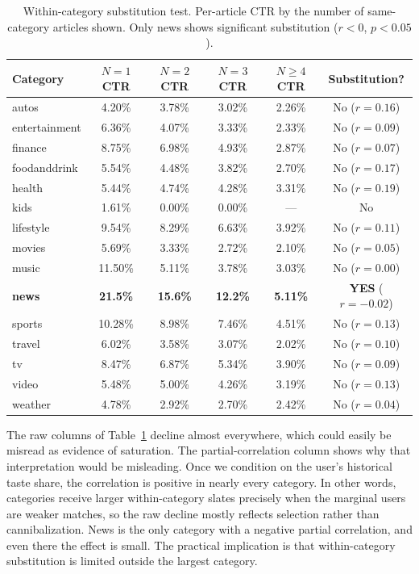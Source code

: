\documentclass[11pt]{article}
\begin{document}
\begin{table}[ht]
\centering
\caption{Within-category substitution test. Per-article CTR by the number of same-category articles shown. Only news shows significant substitution ($r < 0$, $p < 0.05$).}
\label{tab:substitution}
\small
\begin{tabular}{lccccc}
\toprule
Category & $N{=}1$ CTR & $N{=}2$ CTR & $N{=}3$ CTR & $N{\geq}4$ CTR & Substitution? \\
\midrule
autos & 4.20\% & 3.78\% & 3.02\% & 2.26\% & No ($r{=}0.16$) \\
entertainment & 6.36\% & 4.07\% & 3.33\% & 2.33\% & No ($r{=}0.09$) \\
finance & 8.75\% & 6.98\% & 4.93\% & 2.87\% & No ($r{=}0.07$) \\
foodanddrink & 5.54\% & 4.48\% & 3.82\% & 2.70\% & No ($r{=}0.17$) \\
health & 5.44\% & 4.74\% & 4.28\% & 3.31\% & No ($r{=}0.19$) \\
kids & 1.61\% & 0.00\% & 0.00\% & --- & No \\
lifestyle & 9.54\% & 8.29\% & 6.63\% & 3.92\% & No ($r{=}0.11$) \\
movies & 5.69\% & 3.33\% & 2.72\% & 2.10\% & No ($r{=}0.05$) \\
music & 11.50\% & 5.11\% & 3.78\% & 3.03\% & No ($r{=}0.00$) \\
\textbf{news} & \textbf{21.5\%} & \textbf{15.6\%} & \textbf{12.2\%} & \textbf{5.11\%} & \textbf{YES} ($r{=}{-}0.02$) \\
sports & 10.28\% & 8.98\% & 7.46\% & 4.51\% & No ($r{=}0.13$) \\
travel & 6.02\% & 3.58\% & 3.07\% & 2.02\% & No ($r{=}0.10$) \\
tv & 8.47\% & 6.87\% & 5.34\% & 3.90\% & No ($r{=}0.09$) \\
video & 5.48\% & 5.00\% & 4.26\% & 3.19\% & No ($r{=}0.13$) \\
weather & 4.78\% & 2.92\% & 2.70\% & 2.42\% & No ($r{=}0.04$) \\
\bottomrule
\end{tabular}
\end{table}
\FloatBarrier

The raw columns of Table~\ref{tab:substitution} decline almost everywhere, which could easily be misread as evidence of saturation. The partial-correlation column shows why that interpretation would be misleading. Once we condition on the user's historical taste share, the correlation is positive in nearly every category. In other words, categories receive larger within-category slates precisely when the marginal users are weaker matches, so the raw decline mostly reflects selection rather than cannibalization. News is the only category with a negative partial correlation, and even there the effect is small. The practical implication is that within-category substitution is limited outside the largest category.
\end{document}
